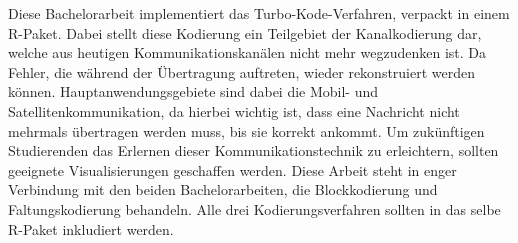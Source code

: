 Diese Bachelorarbeit implementiert das Turbo-Kode-Verfahren, verpackt in einem R-Paket. Dabei stellt diese Kodierung ein Teilgebiet der Kanalkodierung dar, welche aus heutigen Kommunikationskanälen nicht mehr wegzudenken ist. Da Fehler, die während der Übertragung auftreten, wieder rekonstruiert werden können. Hauptanwendungsgebiete sind dabei die Mobil- und Satellitenkommunikation, da hierbei wichtig ist, dass eine Nachricht nicht mehrmals übertragen werden muss, bis sie korrekt ankommt. Um zukünftigen Studierenden das Erlernen dieser Kommunikationstechnik zu erleichtern, sollten geeignete Visualisierungen geschaffen werden. Diese Arbeit steht in enger Verbindung mit den beiden Bachelorarbeiten, die Blockkodierung und Faltungskodierung behandeln. Alle drei Kodierungsverfahren sollten in das selbe R-Paket inkludiert werden.
